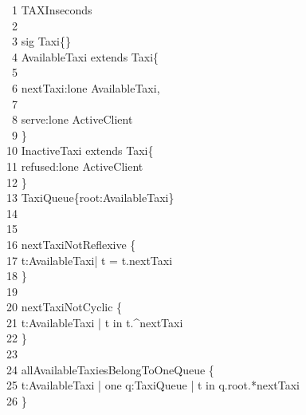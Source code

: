 \-     \ \ 1	 TAXInseconds\\
\-     \ \ 2	\\
\-     \ \ 3	 {\color{blue}sig} Taxi\{\}\\
\-     \ \ 4	 AvailableTaxi {\color{blue}extends} Taxi\{\\
\-     \ \ 5	\qquad \-\\
\-     \ \ 6	\qquad \-\qquad nextTaxi:lone AvailableTaxi, \\
\-     \ \ 7	\qquad \-\\
\-     \ \ 8	\qquad \-\qquad serve:lone ActiveClient\\
\-     \ \ 9	\qquad \}\\
\-    \ 10	 InactiveTaxi {\color{blue}extends} Taxi\{\\
\-    \ 11	\qquad \-\qquad refused:lone ActiveClient\\
\-    \ 12	\qquad \}\\
\-    \ 13	 TaxiQueue\{root:AvailableTaxi\}\\
\-    \ 14	\qquad \\
\-    \ 15	\\
\-    \ 16	 nextTaxiNotReflexive \{ \\
\-    \ 17	\qquad \- t:AvailableTaxi| t = t.nextTaxi \\
\-    \ 18	\qquad \}\\
\-    \ 19	\\
\-    \ 20	 nextTaxiNotCyclic \{\\
\-    \ 21	\qquad \- t:AvailableTaxi | t {\color{blue}in} t.\string^nextTaxi\\
\-    \ 22	\qquad \} \\
\-    \ 23	\\
\-    \ 24	 allAvailableTaxiesBelongToOneQueue \{\\
\-    \ 25	\qquad \- t:AvailableTaxi | {\color{blue}one} q:TaxiQueue | t {\color{blue}in} q.root.*nextTaxi\\
\-    \ 26	\qquad \}\\
